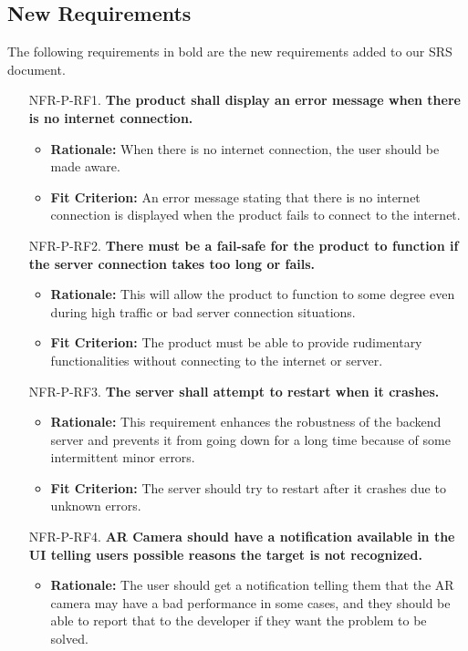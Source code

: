 \documentclass{article}
\begin{document}
\subsection{New Requirements}
The following requirements in bold are the new requirements added to our SRS document.
\begin{itemize}
	\item[NFR-P-RF1.] \textbf{The product shall display an error message when there is no internet connection.}
    \begin{itemize}
        \item \textbf{Rationale:} When there is no internet connection, the user should be made aware.
        \item \textbf{Fit Criterion:} An error message stating that there is no internet connection is displayed when the product fails to connect to the internet.
    \end{itemize}
	\item[NFR-P-RF2.] \textbf{There must be a fail-safe for the product to function if the server connection takes too long or fails.}
    \begin{itemize}
        \item \textbf{Rationale:} This will allow the product to function to some degree even during high traffic or bad server connection situations.
        \item \textbf{Fit Criterion:} The product must be able to provide rudimentary functionalities without connecting to the internet or server.
    \end{itemize}
	\item[NFR-P-RF3.] \textbf{The server shall attempt to restart when it crashes.}
    \begin{itemize}
        \item \textbf{Rationale:} This requirement enhances the robustness of the backend server and prevents it from going down for a long time because of some intermittent minor errors.
        \item \textbf{Fit Criterion:} The server should try to restart after it crashes due to unknown errors.
    \end{itemize}
	\item[NFR-P-RF4.] \textbf{AR Camera should have a notification available in the UI telling users possible reasons the target is not recognized.}
    \begin{itemize}
        \item \textbf{Rationale:} The user should get a notification telling them that the AR camera may have a bad performance in some cases, and they should be able to report that to the developer if they want the problem to be solved.

\end{itemize}
\end{itemize}
\end{document}
